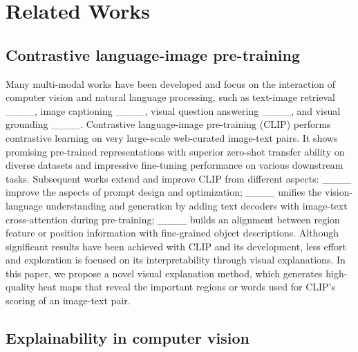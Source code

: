 \section{Related Works}
\label{sec:related}
\vspace{-0.1cm}



\vspace{-0.1cm}
\subsection{Contrastive language-image pre-training}

Many multi-modal works have been developed and focus on the interaction of computer vision and natural language processing, such as text-image retrieval ____, image captioning ____, visual question answering ____, and visual grounding ____.
Contrastive language-image pre-training (CLIP) performs contrastive learning on very large-scale web-curated image-text pairs. It shows  promising pre-trained representations with superior zero-shot transfer ability on diverse datasets and impressive fine-tuning performance on various downstream tasks. 
Subsequent works extend and improve CLIP from different aspects: ____ improve the aspects of prompt design and optimization; ____ unifies the vision-language understanding and generation by adding text decoders with image-text cross-attention during pre-training; ____ builds an alignment between region feature or position information with fine-grained object descriptions. 
Although significant results have been achieved with CLIP and its development, less effort and exploration is focused on its interpretability through visual explanations. In this paper, we propose a novel visual explanation method, which generates high-quality heat maps that reveal the important regions or words used for CLIP's scoring of an image-text pair. 

\vspace{-0.1cm}
\subsection{Explainability in computer vision}

